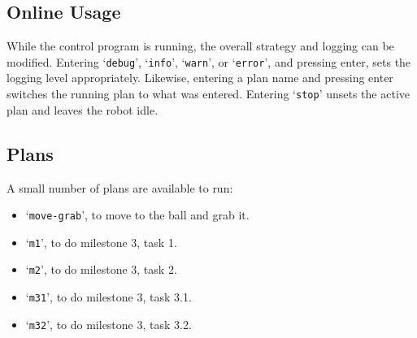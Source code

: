 \documentclass[a4paper]{scrartcl}
\begin{document}
\subsection{Online Usage}

While the control program is running, the overall strategy and logging can be
modified. Entering `\texttt{debug}', `\texttt{info}', `\texttt{warn}', or
`\texttt{error}', and pressing enter, sets the logging level appropriately.
Likewise, entering a plan name and pressing enter switches the running plan to
what was entered. Entering `\texttt{stop}' unsets the active plan and leaves
the robot idle.

\subsection{Plans}

A small number of plans are available to run:

\begin{itemize}
    \item `\texttt{move-grab}', to move to the ball and grab it.
    \item `\texttt{m1}', to do milestone 3, task 1.
    \item `\texttt{m2}', to do milestone 3, task 2.
    \item `\texttt{m31}', to do milestone 3, task 3.1.
    \item `\texttt{m32}', to do milestone 3, task 3.2.
\end{itemize}


\end{document}
